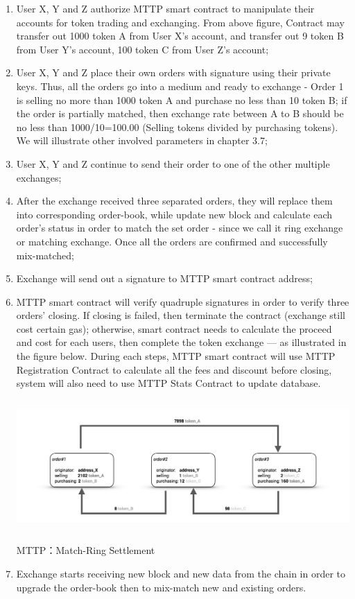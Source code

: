 \documentclass[UTF8,nofonts]{article}
\makeatletter
\newenvironment{figurehere}
 {\def\@captype{figure}}
 {}
\makeatother
\begin{document}
\begin{enumerate}
 \item User X,  Y and Z authorize MTTP smart contract to manipulate their accounts for token trading and exchanging. From above figure,  Contract may transfer out 1000 token A from User X's account,  and transfer out 9 token B from User Y's account,  100 token C from User Z's account;
 \item User X,  Y and Z place their own orders with signature using their private keys. Thus,  all the orders go into a medium and ready to exchange - Order 1 is selling no more than 1000 token A and purchase no less than 10 token B; if the order is partially matched,  then exchange rate between A to B should be no less than 1000/10=100.00 (Selling tokens divided by purchasing tokens). We will illustrate other involved parameters in chapter 3.7;
 \item User X,  Y and Z continue to send their order to one of the other multiple exchanges;
 \item After the exchange received three separated orders,  they will replace them into corresponding order-book, while update new block and calculate each order's status in order to match the set order - since we call it ring exchange or matching exchange. Once all the orders are confirmed and successfully mix-matched;
 \item Exchange will send out a signature to MTTP smart contract address;
 \item MTTP smart contract will verify quadruple signatures in order to verify three orders' closing. If closing is failed,  then terminate the contract (exchange still cost certain gas); otherwise,  smart contract needs to calculate the proceed and cost for each users, then complete the token exchange --- as illustrated in the figure below. During each steps, MTTP smart contract will use MTTP Registration Contract to calculate all the fees and discount before closing,  system will also need to use MTTP Stats Contract to update database.

\begin{center}
\begin{figurehere}
\includegraphics[height=5cm]{images/en-mttp-example.png}
\caption{MTTP：Match-Ring Settlement}
\label{fig:MTTPprotocol}
\end{figurehere}
\end{center}
  
  
 \item Exchange starts receiving new block and new data from the chain in order to upgrade the order-book then to mix-match new and existing orders.
\end{enumerate}
\end{document}
